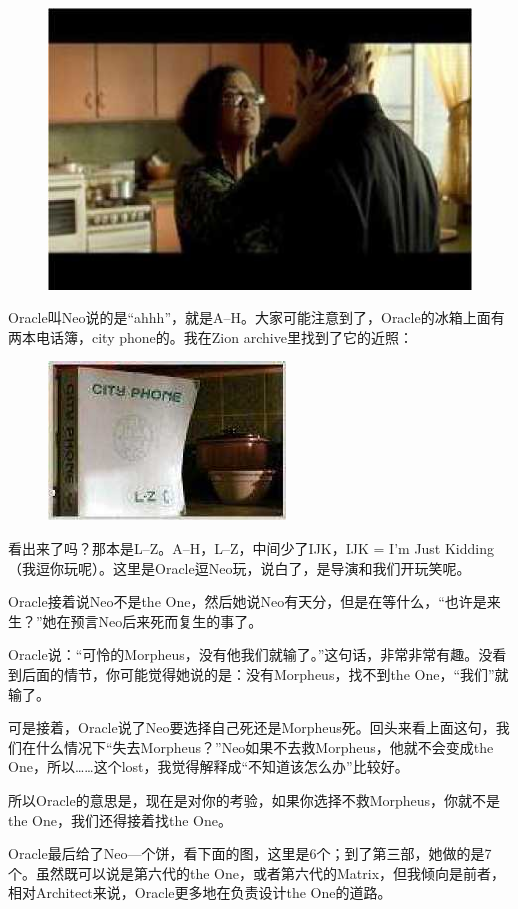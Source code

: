 \documentclass{ctexart}
\begin{document}
\begin{figure}[htb]
\centering
\includegraphics[width=0.5\linewidth]{fig/read_Matrix-49}
\end{figure}

Oracle叫Neo说的是“ahhh”，就是A--H。大家可能注意到了，Oracle的冰箱上面有两本电话簿，city phone的。我在Zion archive里找到了它的近照：

\begin{figure}[htb]
\centering
\includegraphics[width=0.5\linewidth]{fig/read_Matrix-50}
\end{figure}

看出来了吗？那本是L--Z。A--H，L--Z，中间少了IJK，IJK = I'm Just Kidding（我逗你玩呢）。这里是Oracle逗Neo玩，说白了，是导演和我们开玩笑呢。

Oracle接着说Neo不是the One，然后她说Neo有天分，但是在等什么，“也许是来生？”她在预言Neo后来死而复生的事了。

Oracle说：“可怜的Morpheus，没有他我们就输了。”这句话，非常非常有趣。没看到后面的情节，你可能觉得她说的是：没有Morpheus，找不到the One，“我们”就输了。

可是接着，Oracle说了Neo要选择自己死还是Morpheus死。回头来看上面这句，我们在什么情况下“失去Morpheus？”Neo如果不去救Morpheus，他就不会变成the One，所以……这个lost，我觉得解释成“不知道该怎么办”比较好。

所以Oracle的意思是，现在是对你的考验，如果你选择不救Morpheus，你就不是the One，我们还得接着找the One。

Oracle最后给了Neo—个饼，看下面的图，这里是6个；到了第三部，她做的是7个。虽然既可以说是第六代的the One，或者第六代的Matrix，但我倾向是前者，相对Architect来说，Oracle更多地在负责设计the One的道路。
\end{document}
